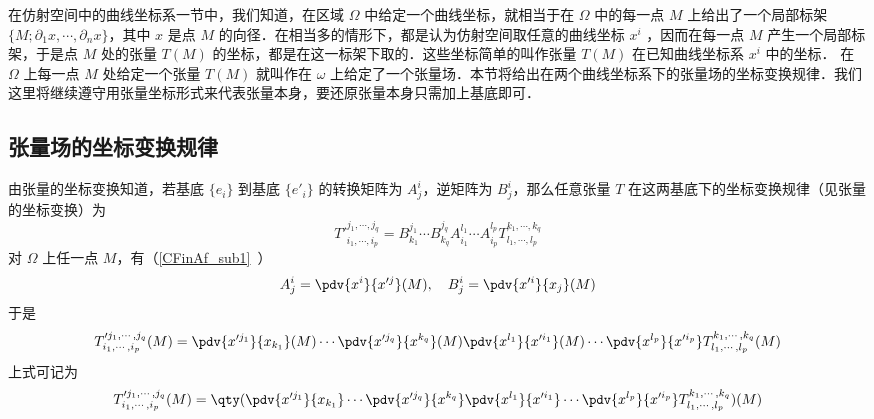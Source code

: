
在仿射空间中的曲线坐标系一节中，我们知道，在区域 $\Omega$ 中给定一个曲线坐标，就相当于在 $\Omega$ 中的每一点 $M$ 上给出了一个局部标架 $\{M;\partial_1 x,\cdots,\partial_n x\}$，其中 $x$ 是点 $M$ 的向径．在相当多的情形下，都是认为仿射空间取任意的曲线坐标 $x^i$ ，因而在每一点 $M$ 产生一个局部标架，于是点 $M$ 处的张量 $T(M)$ 的坐标，都是在这一标架下取的．这些坐标简单的叫作张量 $T(M)$ 在已知曲线坐标系 $x^i$ 中的坐标． 在 $\Omega$ 上每一点 $M$ 处给定一个张量 $T(M)$ 就叫作在 $\omega$ 上给定了一个张量场．本节将给出在两个曲线坐标系下的张量场的坐标变换规律．我们这里将继续遵守用张量坐标形式来代表张量本身，要还原张量本身只需加上基底即可．

\subsection{张量场的坐标变换规律}
由张量的坐标变换知道，若基底 $\{e_i\}$ 到基底 $\{e'_i\}$ 的转换矩阵为 $A^i_j$，逆矩阵为 $B^i_j$，那么任意张量 $T$ 在这两基底下的坐标变换规律（见张量的坐标变换）为
\begin{equation}
T'^{j_1,\cdots,j_q}_{i_1,\cdots,i_p}=B^{j_1}_{k_1}\cdots B^{j_q}_{k_q}A^{l_1}_{i_1}\cdots A^{l_p}_{i_p}T^{k_1,\cdots,k_q}_{l_1,\cdots,l_p}
\end{equation}
对 $\Omega$ 上任一点 $M$，有（\autoref{CFinAf_sub1}~）
\begin{equation}
A^i_j=\pdv{x^i}{x'^j}(M),\quad B^i_j=\pdv{x'^i}{x_j}(M)
\end{equation}
于是
\begin{equation}
T'^{j_1,\cdots,j_q}_{i_1,\cdots,i_p}(M)=\pdv{x'^{j_1}}{x_{k_1}}(M)\cdots \pdv{x'^{j_q}}{x^{k_q}}(M)\pdv{x^{l_1}}{x'^{i_1}}(M)\cdots \pdv{x^{l_p}}{x'^{i_p}}T^{k_1,\cdots,k_q}_{l_1,\cdots,l_p}(M)
\end{equation}
上式可记为
\begin{equation}
T'^{j_1,\cdots,j_q}_{i_1,\cdots,i_p}(M)=\qty(\pdv{x'^{j_1}}{x_{k_1}}\cdots \pdv{x'^{j_q}}{x^{k_q}}\pdv{x^{l_1}}{x'^{i_1}}\cdots \pdv{x^{l_p}}{x'^{i_p}}T^{k_1,\cdots,k_q}_{l_1,\cdots,l_p})(M)
\end{equation}



